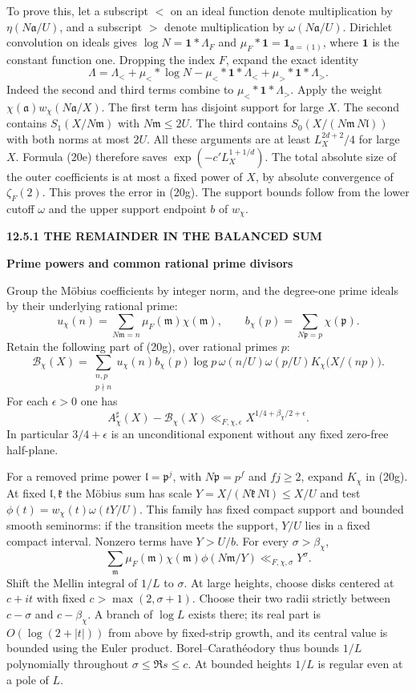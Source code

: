 \documentclass[11pt,letterpaper]{article}
\newcommand{\rightmarktext}{}
\newcommand{\printfolio}{}
\newcommand{\leaf}[4]{\clearpage\gdef\printfolio{#1}\gdef\rightmarktext{#2}%
  {\small\sffamily\bfseries\color{ink}#3\par}\vspace{3pt}%
  {\LARGE\bfseries #4\par}\vspace{5pt}}
\begin{document}
To prove this, let a subscript $<$ on an ideal function denote
multiplication by $\eta(N\mathfrak a/U)$, and a subscript $>$ denote
multiplication by $\omega(N\mathfrak a/U)$. Dirichlet convolution on
ideals gives $\log N=\mathbf1*\Lambda_F$ and
$\mu_F*\mathbf1=\mathbf1_{\mathfrak a=(1)}$, where $\mathbf1$ is the
constant function one. Dropping the index $F$, expand the exact identity
\[
  \Lambda=\Lambda_<+\mu_<*\log N
          -\mu_<*\mathbf1*\Lambda_<+\mu_>*\mathbf1*\Lambda_>.
\]
Indeed the second and third terms combine to $\mu_<*\mathbf1*\Lambda_>$.
Apply the weight $\chi(\mathfrak a)w_\chi(N\mathfrak a/X)$. The first
term has disjoint support for large $X$. The second contains
$S_1(X/N\mathfrak m)$ with $N\mathfrak m\le2U$.
The third contains $S_0(X/(N\mathfrak m\,N\mathfrak l))$
with both norms at most $2U$. All these arguments are at least
$L_X^{2d+2}/4$ for large $X$. Formula (20e) therefore saves
$\exp(-c' L_X^{1+1/d})$. The total absolute size of the outer
coefficients is at most a fixed power of $X$, by absolute convergence
of $\zeta_F(2)$. This proves the error in (20g). The support bounds
follow from the lower cutoff $\omega$ and the upper support endpoint
$b$ of $w_\chi$.

\leaf{520f}{Degree-one prime ideals}{12.5.1 \quad THE REMAINDER IN THE BALANCED SUM}{Prime powers and common rational prime divisors}
Group the M\"obius coefficients by integer norm, and the degree-one
prime ideals by their underlying rational prime:
\[
 u_\chi(n)=\sum_{N\mathfrak m=n}\mu_F(\mathfrak m)\chi(\mathfrak m),
 \qquad b_\chi(p)=\sum_{N\mathfrak p=p}\chi(\mathfrak p).
\]
Retain the following part of (20g), over rational primes $p$:
\[
 \mathcal B_\chi(X)=\sum_{\substack{n,p\\p\nmid n}}
     u_\chi(n)b_\chi(p)\log p\,\omega(n/U)\omega(p/U)
                  K_\chi\big(X/(np)\big).
 \tag{20h}
\]
For each $\epsilon>0$ one has
\[
        A^\sharp_\chi(X)-\mathcal B_\chi(X)
           \ll_{F,\chi,\epsilon}X^{1/4+\beta_\chi/2+\epsilon}.
 \tag{20i}
\]
In particular $3/4+\epsilon$ is an unconditional exponent without any
fixed zero-free half-plane.

For a removed prime power $\mathfrak l=\mathfrak p^j$, with
$N\mathfrak p=p^f$ and $fj\ge2$, expand $K_\chi$ in (20g).
At fixed $\mathfrak l,\mathfrak k$ the M\"obius sum has scale
$Y=X/(N\mathfrak k\,N\mathfrak l)\le X/U$ and test
$\phi(t)=w_\chi(t)\omega(tY/U)$. This family has fixed compact
support and bounded smooth seminorms: if the transition meets the
support, $Y/U$ lies in a fixed compact interval. Nonzero terms have
$Y>U/b$. For every $\sigma>\beta_\chi$,
\[
       \sum_{\mathfrak m}\mu_F(\mathfrak m)\chi(\mathfrak m)
          \phi(N\mathfrak m/Y)\ll_{F,\chi,\sigma}Y^\sigma .
 \tag{20j}
\]
Shift the Mellin integral of $1/L$ to $\sigma$. At large heights,
choose disks centered at $c+it$ with fixed $c>\max(2,\sigma+1)$.
Choose their two radii strictly between $c-\sigma$ and
$c-\beta_\chi$. A branch of $\log L$ exists there; its real part
is $O(\log(2+|t|))$ from above by fixed-strip growth, and its central
value is bounded using the Euler product. Borel--Carath\'eodory thus
bounds $1/L$ polynomially throughout $\sigma\le\Re s\le c$.
At bounded heights $1/L$ is regular even at a pole of $L$.
\end{document}

